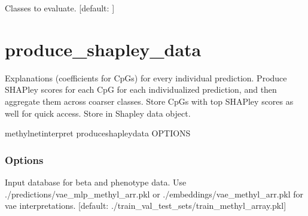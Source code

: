 \documentclass[letterpaper,10pt,english]{sphinxmanual}
\begin{document}
\begin{fulllineitems}
\label{\detokenize{index:cmdoption-methylnet-interpret-plot-top-cpgs-c}}
Classes to evaluate.  {[}default: {]}

\end{fulllineitems}



\section{produce\_shapley\_data}
\label{\detokenize{index:methylnet-interpret-produce-shapley-data}}
Explanations (coefficients for CpGs) for every individual prediction.
Produce SHAPley scores for each CpG for each individualized prediction, and then aggregate them across coarser classes.
Store CpGs with top SHAPley scores as well for quick access.
Store in Shapley data object.

\begin{sphinxVerbatim}[commandchars=\\\{\}]
methylnet\PYGZhy{}interpret produce\PYGZus{}shapley\PYGZus{}data \PYG{o}{[}OPTIONS\PYG{o}{]}
\end{sphinxVerbatim}
\subsubsection*{Options}

\begin{fulllineitems}
\label{\detokenize{index:cmdoption-methylnet-interpret-produce-shapley-data-i}}
Input database for beta and phenotype data. Use ./predictions/vae\_mlp\_methyl\_arr.pkl or ./embeddings/vae\_methyl\_arr.pkl for vae interpretations.  {[}default: ./train\_val\_test\_sets/train\_methyl\_array.pkl{]}

\end{fulllineitems}
\end{document}
